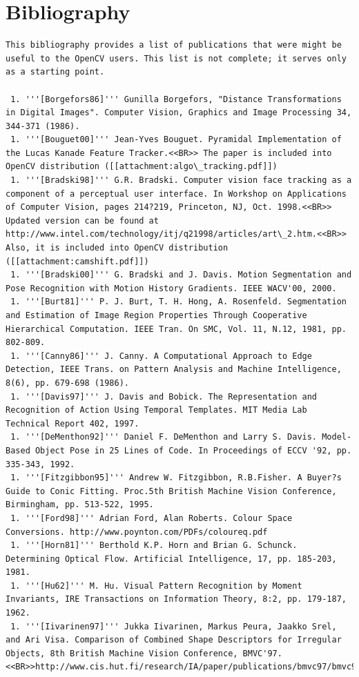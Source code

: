 \section{Bibliography}
\begin{verbatim}
This bibliography provides a list of publications that were might be useful to the OpenCV users. This list is not complete; it serves only as a starting point.

 1. '''[Borgefors86]''' Gunilla Borgefors, "Distance Transformations in Digital Images". Computer Vision, Graphics and Image Processing 34, 344-371 (1986).
 1. '''[Bouguet00]''' Jean-Yves Bouguet. Pyramidal Implementation of the Lucas Kanade Feature Tracker.<<BR>> The paper is included into OpenCV distribution ([[attachment:algo\_tracking.pdf]])
 1. '''[Bradski98]''' G.R. Bradski. Computer vision face tracking as a component of a perceptual user interface. In Workshop on Applications of Computer Vision, pages 214?219, Princeton, NJ, Oct. 1998.<<BR>> Updated version can be found at http://www.intel.com/technology/itj/q21998/articles/art\_2.htm.<<BR>> Also, it is included into OpenCV distribution ([[attachment:camshift.pdf]])
 1. '''[Bradski00]''' G. Bradski and J. Davis. Motion Segmentation and Pose Recognition with Motion History Gradients. IEEE WACV'00, 2000.
 1. '''[Burt81]''' P. J. Burt, T. H. Hong, A. Rosenfeld. Segmentation and Estimation of Image Region Properties Through Cooperative Hierarchical Computation. IEEE Tran. On SMC, Vol. 11, N.12, 1981, pp. 802-809.
 1. '''[Canny86]''' J. Canny. A Computational Approach to Edge Detection, IEEE Trans. on Pattern Analysis and Machine Intelligence, 8(6), pp. 679-698 (1986).
 1. '''[Davis97]''' J. Davis and Bobick. The Representation and Recognition of Action Using Temporal Templates. MIT Media Lab Technical Report 402, 1997.
 1. '''[DeMenthon92]''' Daniel F. DeMenthon and Larry S. Davis. Model-Based Object Pose in 25 Lines of Code. In Proceedings of ECCV '92, pp. 335-343, 1992.
 1. '''[Fitzgibbon95]''' Andrew W. Fitzgibbon, R.B.Fisher. A Buyer?s Guide to Conic Fitting. Proc.5th British Machine Vision Conference, Birmingham, pp. 513-522, 1995.
 1. '''[Ford98]''' Adrian Ford, Alan Roberts. Colour Space Conversions. http://www.poynton.com/PDFs/coloureq.pdf
 1. '''[Horn81]''' Berthold K.P. Horn and Brian G. Schunck. Determining Optical Flow. Artificial Intelligence, 17, pp. 185-203, 1981.
 1. '''[Hu62]''' M. Hu. Visual Pattern Recognition by Moment Invariants, IRE Transactions on Information Theory, 8:2, pp. 179-187, 1962.
 1. '''[Iivarinen97]''' Jukka Iivarinen, Markus Peura, Jaakko Srel, and Ari Visa. Comparison of Combined Shape Descriptors for Irregular Objects, 8th British Machine Vision Conference, BMVC'97.<<BR>>http://www.cis.hut.fi/research/IA/paper/publications/bmvc97/bmvc97.html

\end{verbatim}
